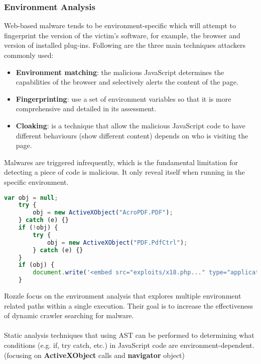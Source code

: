 \documentclass[11pt]{article}
\begin{document}
\subsubsection{Environment Analysis}
Web-based malware tends to be environment-specific which will attempt to fingerprint the version of the victim's software, for example, the browser and version of installed plug-ins. Following are the three main techniques attackers commonly used:
\begin{itemize}
  	\item \textbf{Environment matching}: the malicious JavaScript determines the capabilities of the browser and selectively alerts the content of the page. 
  	\item \textbf{Fingerprinting}: use a set of environment variables so that it is more comprehensive and detailed in its assessment. 
  	\item \textbf{Cloaking}\cite{Cloaking}: is a technique that allow the malicious JavaScript code to have different behaviours (show different content) depends on who is visiting the page.
\end{itemize}
Malwares are triggered infrequently, which is the fundamental limitation for detecting a piece of code is malicious. It only reveal itself when running in the specific environment. 
\begin{lstlisting}[language=JavaScript,title=(Example JavaScript that checks for specific environment)]
	var obj = null;
	try {
	    obj = new ActiveXObject("AcroPDF.PDF");
	} catch (e) {}
	if (!obj) {
	    try {
	        obj = new ActiveXObject("PDF.PdfCtrl");
	    } catch (e) {}
	}
	if (obj) {
	    document.write('<embed src="exploits/x18.php..." type="application/pdf" width=100 height=100></embed>');
	}
\end{lstlisting}
Rozzle\cite{Rozzle} focus on the environment analysis that explores multiple environment related paths within a single execution. Their goal is to increase the effectiveness of dynamic crawler searching for malware. \\ \\
Static analysis techniques that using AST can be performed to determining what conditions (e.g. if, try catch, etc.) in JavaScript code are environment-dependent.(focusing on  \textbf{ActiveXObject} calls and \textbf{navigator} object)
\newpage
\end{document}
